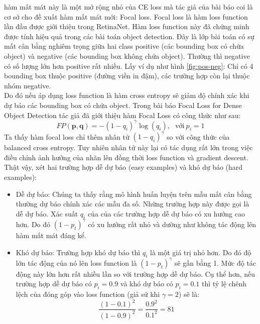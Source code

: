 \documentclass[a4paper, 12pt]{report}
\begin{document}
hàm mất mát này là một mở rộng nhỏ của CE loss mà tác giả của bài báo coi là cơ sở cho đề xuất hàm mất mát mới: Focal loss. Focal loss là hàm loss function lần đầu được giới thiệu trong RetinaNet. Hàm loss function này đã chứng minh được tính hiệu quả trong các bài toán object detection. Đây là lớp bài toán có sự mất cân bằng nghiêm trọng giữa hai class positive (các bounding box có chứa object) và negative (các bounding box không chứa object). Thường thì negative có số lượng lớn hơn positive rất nhiều. Lấy ví dụ như hình \ref{fig:pos-neg}: Chỉ có 4 bounding box thuộc positive (đường viền in đậm), các trường hợp còn lại thuộc nhóm negative. \\
Do đó nếu áp dụng loss function là hàm cross entropy sẽ giảm độ chính xác khi dự báo các bounding box có chứa object. Trong bài báo Focal Loss for Dense Object Detection tác giả đã giới thiệu hàm Focal Loss có công thức như sau:
\begin{equation}
	FP(\mathbf{p}, \mathbf{q}) = - (1-q_i)^{\gamma} \log(q_i), ~~~ \text{với} ~ p_i=1
\end{equation}
Ta thấy hàm focal loss chỉ thêm nhân tử $(1-q_i)^{\gamma}$ so với công thức của balanced cross entropy. Tuy nhiên nhân tử này lại có tác dụng rất lớn trong việc điều chỉnh ảnh hưởng của nhãn lên đồng thời loss function và gradient descent. Thật vậy, xét hai trường hợp dễ dự báo (easy examples) và khó dự báo (hard examples):
\begin{itemize}
	\item Dễ dự báo: Chúng ta thấy rằng mô hình huấn luyện trên mẫu mất cân bằng thường dự báo chính xác các mẫu đa số. Những trường hợp này được gọi là dễ dự báo. Xác suất $q_i$ của của các trường hợp dễ dự báo có xu hướng cao hơn. Do đó $(1-p_t)^{\gamma}$  có xu hướng rất nhỏ và dường như không tác động lên hàm mất mát đáng kể.
	\item Khó dự báo: Trường hợp khó dự báo thì  $q_i$  là một giá trị nhỏ hơn. Do đó độ lớn tác động của nó lên loss function là $(1-p_t)^{\gamma}$ sẽ gần bằng 1. Mức độ tác động này lớn hơn rất nhiều lần so với trường hợp dễ dự báo. Cụ thể hơn, nếu trường hợp dễ dự báo có $p_i = 0.9$ và khó dự báo có $p_i = 0.1$ thì tỷ lệ chênh lệch của đóng góp vào loss function (giả sử khi $\gamma=2$) sẽ là:
 \begin{equation*}
 	\frac{(1-0.1)^2}{(1-0.9)^2} = \frac{0.9^2}{0.1^2} = 81
 \end{equation*}


\end{itemize}
\end{document}
